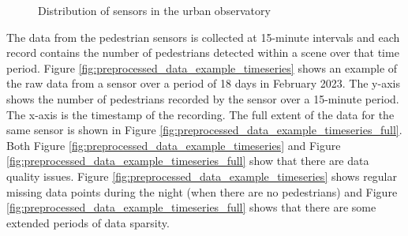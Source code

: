 \begin{figure}[H]
    \centering
    \caption{Distribution of sensors in the urban observatory}
    \label{fig:map_of_sensors}
\end{figure}

The data from the pedestrian sensors is collected at 15-minute intervals and each record contains the number of pedestrians detected within a scene over that time period. Figure \ref{fig:preprocessed_data_example_timeseries} shows an example of the raw data from a sensor over a period of 18 days in February 2023. The y-axis shows the number of pedestrians recorded by the sensor over a 15-minute period. The x-axis is the timestamp of the recording. The full extent of the data for the same sensor is shown in Figure \ref{fig:preprocessed_data_example_timeseries_full}. Both Figure \ref{fig:preprocessed_data_example_timeseries} and Figure \ref{fig:preprocessed_data_example_timeseries_full} show that there are data quality issues. Figure \ref{fig:preprocessed_data_example_timeseries} shows regular missing data points during the night (when there are no pedestrians) and Figure \ref{fig:preprocessed_data_example_timeseries_full} shows that there are some extended periods of data sparsity.

